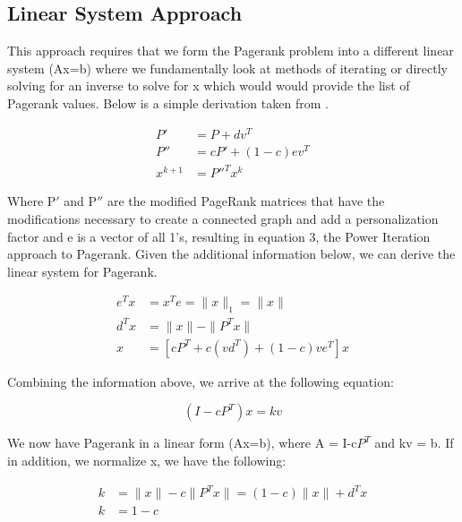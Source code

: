 \documentclass[letterpaper,12pt,onecolumn]{article}
\begin{document}
\subsection{Linear System Approach}
This approach requires that we form the Pagerank problem into a different linear system (Ax=b) where we fundamentally look at methods of iterating or directly solving for an inverse to solve for x which would would provide the list of Pagerank values. Below is a simple derivation taken from \cite{FastParallel}.
\begin{center}
\begin{align}
	P' &= P + dv^{T} \\
	P'' &= cP' + (1-c)ev^{T} \\
	x^{k+1} &= P''^{T}x^{k}
\end{align}

\end{center}
Where P$'$ and P$''$ are the modified PageRank matrices that have the modifications necessary to create a connected graph and add a personalization factor and e is a vector of all 1's, resulting in equation 3, the Power Iteration approach to Pagerank.
\newline
\linebreak
Given the additional information below, we can derive the linear system for Pagerank.


\begin{center}
\begin{align}
  e^{T}x & = x^{T}e = \|x\|_{1} = \|x\| \\
  d^{T}x &= \| x\| - \| P^{T}x\| \\
  x &= [cP^{T} + c(vd^{T}) + (1-c)ve^{T}]x
\end{align}
\end{center}

Combining the information above, we arrive at the following equation:

\begin{center}
\begin{equation}
  (I-cP^{T})x = kv
\end{equation}
\end{center}
We now have Pagerank in a linear form (Ax=b), where A = I-c$P^{T}$ and kv = b. If in addition, we normalize x, we have the following:

\begin{center}
  \begin{align}
	k &= \|x\| - c \|P^{T}x\| = (1-c) \|x\| + d^{T}x \\	
	k &= 1-c 
  \end{align}
\end{center}
\end{document}
